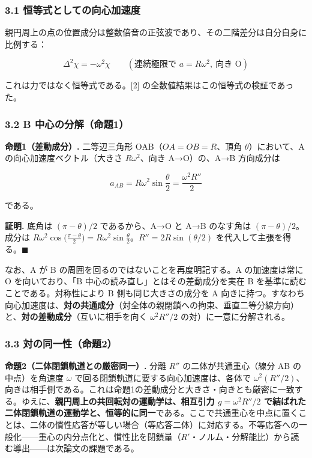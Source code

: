 \documentclass[
  a4paper,
]{ltjsarticle}
\begin{document}
\subsubsection{3.1
恒等式としての向心加速度}\label{ux6052ux7b49ux5f0fux3068ux3057ux3066ux306eux5411ux5fc3ux52a0ux901fux5ea6}

親円周上の点の位置成分は整数倍音の正弦波であり、その二階差分は自分自身に比例する：

\[
\Delta^2\chi=-\omega^2\chi\qquad(\text{連続極限で }a=R\omega^2,\ \text{向き O})
\]

これは力ではなく恒等式である。{[}2{]}
の全数値結果はこの恒等式の検証であった。

\subsubsection{3.2 B
中心の分解（命題1）}\label{b-ux4e2dux5fc3ux306eux5206ux89e3ux547dux984c1}

\textbf{命題1（差動成分）.} 二等辺三角形 OAB（\(OA=OB=R\)、頂角
\(\theta\)）において、A の向心加速度ベクトル（大きさ \(R\omega^2\)、向き
A→O）の、A→B 方向成分は

\[
a_{AB}=R\omega^2\sin\frac{\theta}{2}=\frac{\omega^2 R''}{2}
\]

である。

\textbf{証明.} 底角は \((\pi-\theta)/2\) であるから、A→O と A→B
のなす角は \((\pi-\theta)/2\)。成分は
\(R\omega^2\cos\!\big(\tfrac{\pi-\theta}{2}\big)=R\omega^2\sin\tfrac{\theta}{2}\)。\(R''=2R\sin(\theta/2)\)
を代入して主張を得る。\(\blacksquare\)

なお、A が B の周囲を回るのではないことを再度明記する。A の加速度は常に
O を向いており、「B 中心の読み直し」とはその差動成分を実在 B
を基準に読むことである。対称性により B 側も同じ大きさの成分を A
向きに持つ。すなわち向心加速度は、\textbf{対の共通成分}（対全体の親閉鎖への拘束、垂直二等分線方向）と、\textbf{対の差動成分}（互いに相手を向く
\(\omega^2R''/2\) の対）に一意に分解される。

\subsubsection{3.3
対の同一性（命題2）}\label{ux5bfeux306eux540cux4e00ux6027ux547dux984c2}

\textbf{命題2（二体閉鎖軌道との厳密同一）.} 分離 \(R''\)
の二体が共通重心（線分 AB の中点）を角速度 \(\omega\)
で回る閉鎖軌道に要する向心加速度は、各体で
\(\omega^2(R''/2)\)、向きは相手側である。これは命題1の差動成分と大きさ・向きとも厳密に一致する。ゆえに、\textbf{親円周上の共回転対の運動学は、相互引力
\(g=\omega^2R''/2\)
で結ばれた二体閉鎖軌道の運動学と、恒等的に同一}である。ここで共通重心を中点に置くことは、二体の慣性応答が等しい場合（等応答二体）に対応する。不等応答への一般化------重心の内分点化と、慣性比を閉鎖量（\(R'\)・ノルム・分解能比）から読む導出------は次論文の課題である。
\end{document}
